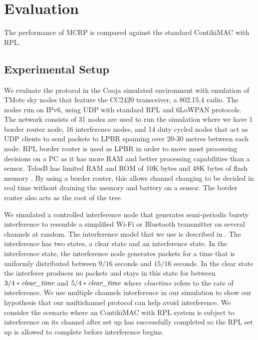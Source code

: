 \section{Evaluation}
\label{sec:evaluation}
The performance of MCRP is compared against the standard ContikiMAC with RPL.

\subsection{Experimental Setup}
We evaluate the protocol in the  Cooja simulated environment with emulation of TMote sky nodes that feature the CC2420 transceiver, a 802.15.4 radio. The nodes run on IPv6, using UDP with standard RPL and 6LoWPAN protocols. The network consists of 31 nodes are used to run the simulation where we have 1 border router node, 16 interference nodes, and 14 duty cycled nodes that act as UDP clients to send packets to LPBR spanning over 20-30 metres between each node. RPL border router is used as LPBR in order to move most processing decisions on a PC as it has more RAM and better processing capabilities than a sensor. TelosB has limited RAM and ROM of 10K bytes and 48K bytes of flash memory \cite{telosb-datasheet}. By using a border router, this allows channel changing to be decided in real time without draining the memory and battery on a sensor. The border router also acts as the root of the tree.

We simulated a controlled interference node that generates semi-periodic bursty interference to resemble a simplified Wi-Fi or Bluetooth transmitter on several channels at random. The interference model that we use is described in \cite{Boano:2010:MSM:2127940.2127963}. The interference has two states, a clear state and an interference state. 
In the interference state, the interference node generates packets for a time that is uniformly distributed between $9/16$ seconds and $15/16$ seconds. In the clear state the interferer produces no packets and stays in this state for between $3/4 * \emph{clear\textunderscore time}$ and $5/4 * \emph{clear\textunderscore time}$ where \emph{clear\textunderscore time} refers to the rate of interference.
We use multiple channels interference in our simulation to show our hypothesis that our multichannel protocol can help avoid interference. We consider the scenario where an ContikiMAC with RPL system is subject to interference on its channel after set up has successfully completed so the RPL set up is allowed to complete before interference begins.

